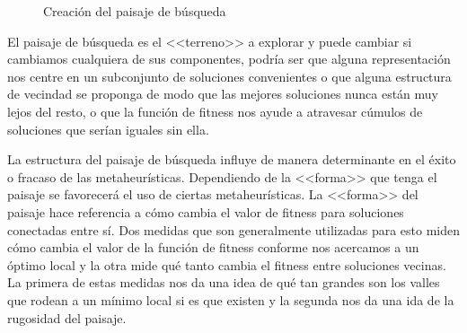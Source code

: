 \begin{figure}[H]
    \label{fig:landscape}
\caption{Creación del paisaje de búsqueda}
\end{figure}

El paisaje de búsqueda es el <<terreno>> a explorar y puede cambiar si cambiamos cualquiera de sus componentes, podría ser que alguna representación nos centre en un subconjunto de soluciones convenientes o que alguna estructura de vecindad se proponga de modo que las mejores soluciones nunca están muy lejos del resto, o que la función de fitness nos ayude a atravesar cúmulos de soluciones que serían iguales sin ella.

La estructura del paisaje de búsqueda influye de manera determinante en el éxito o fracaso de las metaheurísticas. Dependiendo de la <<forma>> que tenga el paisaje se favorecerá el uso de ciertas metaheurísticas. La <<forma>> del paisaje hace referencia a cómo cambia el valor de fitness para soluciones conectadas entre sí. Dos medidas que son generalmente utilizadas para esto miden cómo cambia el valor de la función de fitness conforme nos acercamos a un óptimo local y la otra mide qué tanto cambia el fitness entre soluciones vecinas\cite{skauffman}. La primera de estas medidas nos da una idea de qué tan grandes son los valles que rodean a un mínimo local si es que existen y la segunda nos da una ida de la rugosidad del paisaje.


